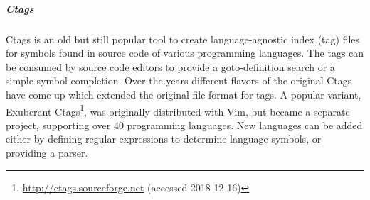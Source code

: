     \subparagraph{Ctags}
    Ctags is an old but still popular tool to create language-agnostic index (tag) files for symbols found in source code of various programming languages. The tags can be consumed by source code editors to provide a goto-definition search or a simple symbol completion. Over the years different flavors of the original Ctags have come up which extended the original file format for tags. A popular variant, Exuberant Ctags\footnote{\url{http://ctags.sourceforge.net} (accessed 2018-12-16)}, was originally distributed with Vim, but became a separate project, supporting over 40 programming languages. New languages can be added either by defining regular expressions to determine language symbols, or providing a parser.


